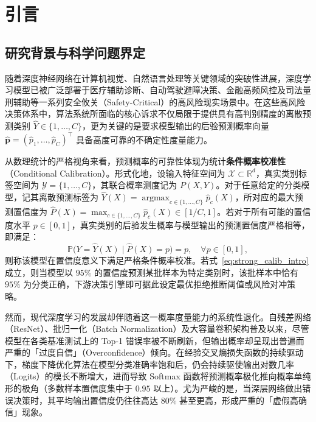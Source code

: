 \section{引言}\label{sec:intro}

\subsection{研究背景与科学问题界定}

随着深度神经网络在计算机视觉、自然语言处理等关键领域的突破性进展，深度学习模型已被广泛部署于医疗辅助诊断、自动驾驶避障决策、金融高频风控及司法量刑辅助等一系列安全攸关（Safety-Critical）的高风险现实场景中。在这些高风险决策体系中，算法系统所面临的核心诉求不仅局限于提供具有高判别精度的离散预测类别 $\hat Y \in \{1, \dots, C\}$，更为关键的是要求模型输出的后验预测概率向量 $\hat{\boldsymbol{p}} = (\hat p_1, \dots, \hat p_C)^\top$ 具备高度可靠的不确定性度量能力。

从数理统计的严格视角来看，预测概率的可靠性体现为统计\textbf{条件概率校准性}（Conditional Calibration）。形式化地，设输入特征空间为 $\mathcal{X} \subset \mathbb{R}^d$，真实类别标签空间为 $\mathcal{Y} = \{1, \dots, C\}$，其联合概率测度记为 $P(X, Y)$。对于任意给定的分类模型，记其离散预测标签为 $\hat Y(X) = \operatorname{argmax}_{c \in \{1,\dots,C\}} \hat p_c(X)$，所对应的最大预测置信度为 $\hat P(X) = \max_{c \in \{1,\dots,C\}} \hat p_c(X) \in [1/C, 1]$。若对于所有可能的置信度水平 $p \in [0, 1]$，真实类别的后验发生概率与模型输出的预测置信度严格相等，即满足：
\begin{equation}\label{eq:strong_calib_intro}
\mathbb{P}\big(Y = \hat Y(X) \;\big|\; \hat P(X) = p\big) = p, \quad \forall p \in [0, 1],
\end{equation}
则称该模型在置信度意义下满足严格条件概率校准。若式~\eqref{eq:strong_calib_intro}成立，则当模型以 $95\%$ 的置信度预测某批样本为特定类别时，该批样本中恰有 $95\%$ 为分类正确，下游决策引擎即可据此设定最优拒绝推断阈值或风险对冲策略。

然而，现代深度学习的发展却伴随着这一概率度量能力的系统性退化。自残差网络（ResNet）、批归一化（Batch Normalization）及大容量卷积架构普及以来，尽管模型在各类基准测试上的 Top-1 错误率被不断刷新，但输出概率却呈现出普遍而严重的「过度自信」（Overconfidence）倾向。在经验交叉熵损失函数的持续驱动下，梯度下降优化算法在模型分类准确率饱和后，仍会持续驱使输出对数几率（Logits）的模长不断增大，进而导致 Softmax 函数将预测概率极化推向概率单纯形的极角（多数样本置信度集中于 $0.95$ 以上）。尤为严峻的是，当深层网络做出错误决策时，其平均输出置信度仍往往高达 $80\%$ 甚至更高，形成严重的「虚假高确信」现象。

